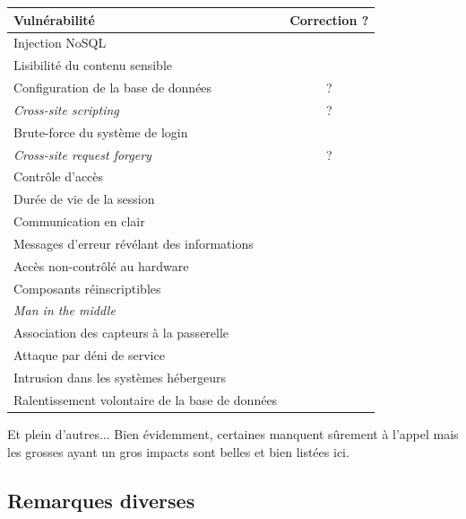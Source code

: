\documentclass[12pt]{article}
\newcommand{\cmark}{\textcolor{pgreen}{\ding{51}}}%
\newcommand{\xmark}{\textcolor{pred}{\ding{55}}}%
\begin{document}
\begin{center}
\renewcommand{\arraystretch}{1.5}
\begin{tabular}{|p{9cm}|c|}
\hline
\textbf{Vulnérabilité} & \textbf{Correction ?} \\
\hline
Injection NoSQL & \cmark \\
\hline
Lisibilité du contenu sensible & \cmark \\
\hline
Configuration de la base de données & ? \\
\hline
\emph{Cross-site scripting} & ? \\
\hline
Brute-force du système de login & \xmark \\
\hline
\emph{Cross-site request forgery} & ? \\
\hline
Contrôle d'accès & \cmark \\
\hline
Durée de vie de la session & \cmark \\
\hline
Communication en clair & \cmark \\
\hline
Messages d'erreur révélant des informations & \cmark \\
\hline
Accès non-contrôlé au hardware & \xmark \\
\hline
Composants réinscriptibles & \xmark \\
\hline
\emph{Man in the middle} & \cmark \\
\hline
Association des capteurs à la passerelle & \cmark \\
\hline
Attaque par déni de service & \xmark \\
\hline
Intrusion dans les systèmes hébergeurs & \cmark \\
\hline
Ralentissement volontaire de la base de données & \cmark \\
\hline
\end{tabular}
\renewcommand{\arraystretch}{1}
\vspace{5mm}
\end{center}

Et plein d'autres... Bien évidemment, certaines manquent sûrement à l'appel mais les grosses ayant un gros impacts sont belles et bien listées ici.

\clearpage
\subsection*{Remarques diverses}
\end{document}
